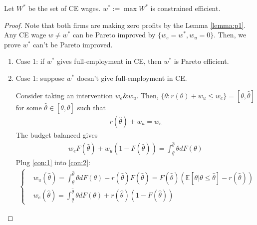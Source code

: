 \documentclass[11pt]{elegantbook}
\begin{document}
\begin{proposition}[$w^*:=\max W^*$ is constrained efficient]
    Let $W^*$ be the set of CE wages. $w^*:=\max W^*$ is constrained efficient.
\end{proposition}
\begin{proof}
    Note that both firms are making zero profits by the Lemma \ref{lemma:p1}. Any CE wage $w\neq w^*$ can be Pareto improved by $\{w_e=w^*,w_u=0\}$. Then, we prove $w^*$ can't be Pareto improved.
    \begin{enumerate}
        \item Case 1: if $w^*$ gives full-employment in CE, then $w^*$ is Pareto efficient.
        \item Case 1: suppose $w^*$ doesn't give full-employment in CE.
        
        Consider taking an intervention $w_e\&w_u$. Then, $\{\theta:r(\theta)+w_u\leq w_e\}=[\underline{\theta},\hat{\theta}]$ for some $\hat{\theta}\in[\underline{\theta},\overline{\theta}]$ such that
        \begin{equation}
            \begin{aligned}
                r(\hat{\theta})+w_u=w_e
            \end{aligned}
            \label{con:1}
        \end{equation}
        The budget balanced gives
        \begin{equation}
            \begin{aligned}
                w_e F(\hat{\theta})+w_u (1-F(\hat{\theta}))=\int_{\underline{\theta}}^{\hat{\theta}}\theta d F(\theta)
            \end{aligned}
            \label{con:2}
        \end{equation}
        Plug \eqref{con:1} into \eqref{con:2}:
        \begin{equation}
            \begin{aligned}
                \left\{\begin{matrix}
                    &w_u(\hat{\theta})=\int_{\underline{\theta}}^{\hat{\theta}}\theta d F(\theta)-r(\hat{\theta})F(\hat{\theta})=F(\hat{\theta})\left(\mathbb{E}[\theta|\theta\leq\hat{\theta}]-r(\hat{\theta})\right)\\
                    &w_e(\hat{\theta})=\int_{\underline{\theta}}^{\hat{\theta}}\theta d F(\theta)+r(\hat{\theta})(1-F(\hat{\theta}))
                \end{matrix}\right.
            \end{aligned}

\end{equation}
\end{enumerate}
\end{proof}
\end{document}
